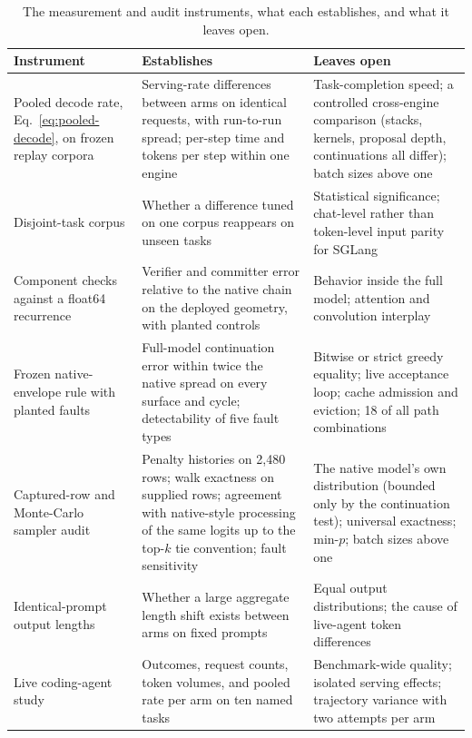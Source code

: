 \documentclass[sigconf,anonymous,review]{acmart}
\begin{document}
\begin{table}[t]
\caption{The measurement and audit instruments, what each establishes, and what it leaves open.}
\label{tab:instruments}
\centering\footnotesize
\renewcommand{\arraystretch}{1.1}
\begin{tabularx}{\textwidth}{@{}>{\raggedright\arraybackslash}p{}YY@{}}
\toprule
Instrument & Establishes & Leaves open \\
\midrule
Pooled decode rate, Eq.~\ref{eq:pooled-decode}, on frozen replay corpora & Serving-rate differences between arms on identical requests, with run-to-run spread; per-step time and tokens per step within one engine & Task-completion speed; a controlled cross-engine comparison (stacks, kernels, proposal depth, continuations all differ); batch sizes above one \\
Disjoint-task corpus & Whether a difference tuned on one corpus reappears on unseen tasks & Statistical significance; chat-level rather than token-level input parity for SGLang \\
Component checks against a float64 recurrence & Verifier and committer error relative to the native chain on the deployed geometry, with planted controls & Behavior inside the full model; attention and convolution interplay \\
Frozen native-envelope rule with planted faults & Full-model continuation error within twice the native spread on every surface and cycle; detectability of five fault types & Bitwise or strict greedy equality; live acceptance loop; cache admission and eviction; 18 of all path combinations \\
Captured-row and Monte-Carlo sampler audit & Penalty histories on 2,480 rows; walk exactness on supplied rows; agreement with native-style processing of the same logits up to the top-$k$ tie convention; fault sensitivity & The native model's own distribution (bounded only by the continuation test); universal exactness; min-$p$; batch sizes above one \\
Identical-prompt output lengths & Whether a large aggregate length shift exists between arms on fixed prompts & Equal output distributions; the cause of live-agent token differences \\
Live coding-agent study & Outcomes, request counts, token volumes, and pooled rate per arm on ten named tasks & Benchmark-wide quality; isolated serving effects; trajectory variance with two attempts per arm \\
\bottomrule
\end{tabularx}
\end{table}
\end{document}
